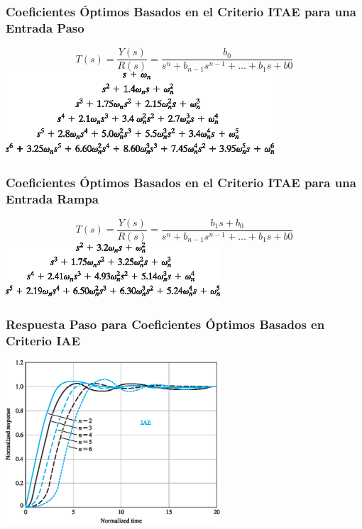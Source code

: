 \documentclass[aspectratio=169,handout]{beamer}
\theoremstyle{definition}
\theoremstyle{plain}
\theoremstyle{remark}
\begin{document}
\begin{frame}[<+->]\frametitle{Coeficientes Óptimos Basados en el Criterio ITAE para una Entrada Paso}
\centering
\begin{equation*}
	T(s) = \frac{Y(s)}{R(s)} = \frac{b_0}{s^n + b_{n-1} s^{n-1} + \dots + b_1 s + b0}
\end{equation*}
\vspace*{10mm}
\includegraphics[width=10cm]{images/optimCoeffsITAEstep.eps}
\end{frame}

\begin{frame}[<+->]\frametitle{Coeficientes Óptimos Basados en el Criterio ITAE para una Entrada Rampa}
\centering
\begin{equation*}
	T(s) = \frac{Y(s)}{R(s)} = \frac{b_1s + b_0}{s^n + b_{n-1} s^{n-1} + \dots + b_1 s + b0}
\end{equation*}
\vspace*{10mm}
\includegraphics[width=8cm]{images/optimCoeffsITAEramp.eps} 
\end{frame}

\begin{frame}[c]\frametitle{Respuesta Paso para Coeficientes Óptimos Basados en Criterio IAE}
\vspace*{5mm}
\centering
\includegraphics[width=8cm]{images/stepResponseOptimIAE.eps}
\end{frame}
\end{document}
